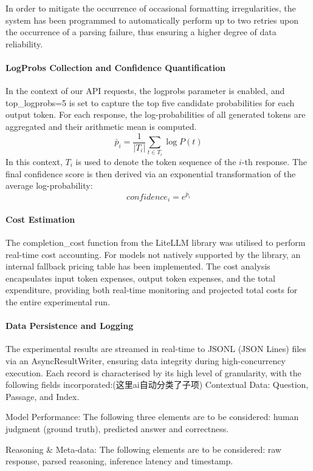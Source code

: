 In order to mitigate the occurrence of occasional formatting irregularities, the system has been programmed to automatically perform up to two retries upon the occurrence of a parsing failure, thus ensuring a higher degree of data reliability.

\paragraph{LogProbs Collection and Confidence Quantification}
In the context of our API requests, the logprobs parameter is enabled, and top\_logprobs=5 is set to capture the top five candidate probabilities for each output token. For each response, the log-probabilities of all generated tokens are aggregated and their arithmetic mean is computed.
$$
\bar{p}_i = \frac{1}{|T_i|} \sum_{t \in T_i} \log P(t)
$$
In this context, $T_i$ is used to denote the token sequence of the $i$-th response. The final confidence score is then derived via an exponential transformation of the average log-probability:
$$
confidence_i = e^{\bar{p}_i}
$$

\paragraph{Cost Estimation}
The completion\_cost function from the LiteLLM library was utilised to perform real-time cost accounting. For models not natively supported by the library, an internal fallback pricing table has been implemented. The cost analysis encapsulates input token expenses, output token expenses, and the total expenditure, providing both real-time monitoring and projected total costs for the entire experimental run.

\paragraph{Data Persistence and Logging}
The experimental results are streamed in real-time to JSONL (JSON Lines) files via an AsyncResultWriter, ensuring data integrity during high-concurrency execution. Each record is characterised by its high level of granularity, with the following fields incorporated:(这里ai自动分类了子项)
Contextual Data: Question, Passage, and Index.

Model Performance: The following three elements are to be considered: human judgment (ground truth), predicted answer and correctness.

Reasoning \& Meta-data: The following elements are to be considered: raw response, parsed reasoning, inference latency and timestamp.

